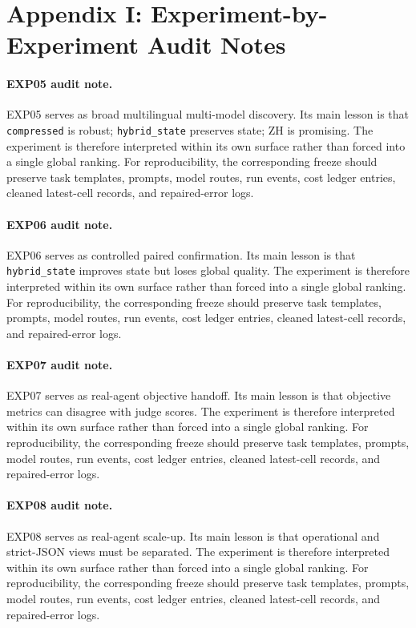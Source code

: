 \documentclass[11pt]{article}
\begin{document}
\section{Appendix I: Experiment-by-Experiment Audit Notes}
\paragraph{EXP05 audit note.} EXP05 serves as broad multilingual multi-model discovery. Its main lesson is that \texttt{compressed} is robust; \texttt{hybrid\_state} preserves state; ZH is promising. The experiment is therefore interpreted within its own surface rather than forced into a single global ranking. For reproducibility, the corresponding freeze should preserve task templates, prompts, model routes, run events, cost ledger entries, cleaned latest-cell records, and repaired-error logs.


\paragraph{EXP06 audit note.} EXP06 serves as controlled paired confirmation. Its main lesson is that \texttt{hybrid\_state} improves state but loses global quality. The experiment is therefore interpreted within its own surface rather than forced into a single global ranking. For reproducibility, the corresponding freeze should preserve task templates, prompts, model routes, run events, cost ledger entries, cleaned latest-cell records, and repaired-error logs.


\paragraph{EXP07 audit note.} EXP07 serves as real-agent objective handoff. Its main lesson is that objective metrics can disagree with judge scores. The experiment is therefore interpreted within its own surface rather than forced into a single global ranking. For reproducibility, the corresponding freeze should preserve task templates, prompts, model routes, run events, cost ledger entries, cleaned latest-cell records, and repaired-error logs.


\paragraph{EXP08 audit note.} EXP08 serves as real-agent scale-up. Its main lesson is that operational and strict-JSON views must be separated. The experiment is therefore interpreted within its own surface rather than forced into a single global ranking. For reproducibility, the corresponding freeze should preserve task templates, prompts, model routes, run events, cost ledger entries, cleaned latest-cell records, and repaired-error logs.
\end{document}
